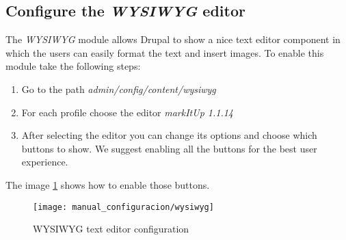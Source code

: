 \subsection{Configure the \textit{WYSIWYG} editor}
The \textit{WYSIWYG} module allows Drupal to show a nice text editor component in which the users can easily format the text and insert images.  To enable this module take the following steps:
\begin{enumerate}
	\item Go to the path \textit{admin/config/content/wysiwyg}
	\item For each profile choose the editor \textit{markItUp 1.1.14}
	\item After selecting the editor you can change its options and choose which buttons to show.  We suggest enabling all the buttons for the best user experience.
\end{enumerate}

The image \ref{fig:manual_configuracion_wysiwyg} shows how to enable those buttons.
\begin{figure}[h]
	\centering
	\texttt{[image: manual\_configuracion/wysiwyg]}
	\caption{WYSIWYG text editor configuration}
	\label{fig:manual_configuracion_wysiwyg}
\end{figure}